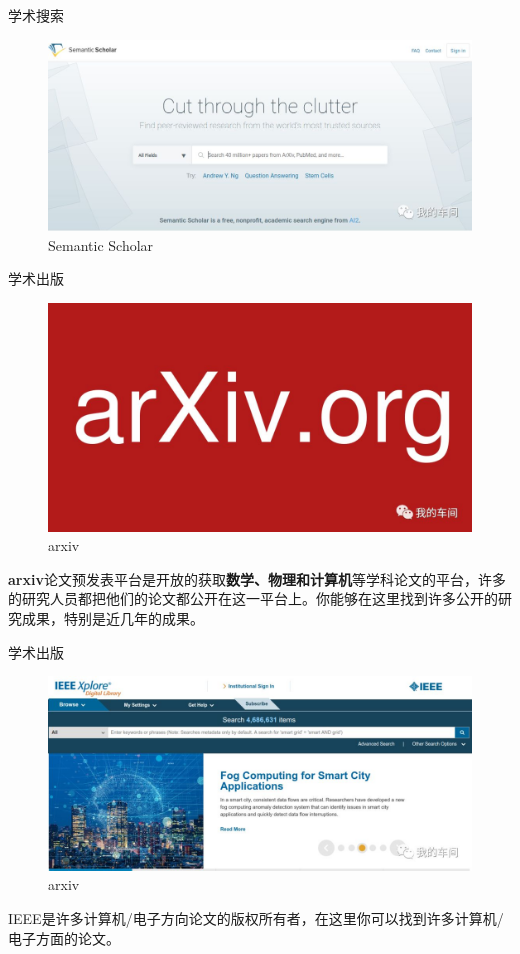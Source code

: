 \documentclass[presentation]{beamer}
\begin{document}
\begin{frame}{学术搜索}
    \begin{figure}
        \centering
          \includegraphics[width=0.8\linewidth]{_6.png}
          \caption{Semantic Scholar}
    \end{figure}
\end{frame}

\begin{frame}{学术出版}
    \begin{figure}
        \centering
          \includegraphics[width=0.5\linewidth]{_7.png}
          \caption{arxiv}
    \end{figure}
	\textbf{arxiv}论文预发表平台是开放的获取\textbf{数学、物理和计算机}等学科论文的平台，许多的研究人员都把他们的论文都公开在这一平台上。你能够在这里找到许多公开的研究成果，特别是近几年的成果。
\end{frame}

\begin{frame}{学术出版}
    \begin{figure}
        \centering
          \includegraphics[width=0.7\linewidth]{_8.png}
          \caption{arxiv}
    \end{figure}
	IEEE是许多计算机/电子方向论文的版权所有者，在这里你可以找到许多计算机/电子方面的论文。
\end{frame}
\end{document}
